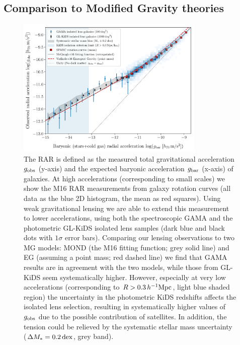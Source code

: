 \documentclass[usenatbib]{mnras}
\newcommand{\hMpc}{\, h^{-1}{\rm{Mpc}} }
\newcommand{\un}[1]{_{\rm #1}}
\newcommand{\dex}{\, {\rm dex}}
\begin{document}
\subsection{Comparison to Modified Gravity theories}
\label{sec:results-analytical}

\begin{figure}
	\includegraphics[width=0.8\textwidth]{Figures/RAR_KiDS+GAMA+Verlinde_Nobins_isolated_zoomout.pdf}
	\caption{The RAR is defined as the measured total gravitational acceleration $g\un{obs}$ (y-axis) and the expected baryonic acceleration $g\un{bar}$ (x-axis) of galaxies. At high accelerations (corresponding to small scales) we show the M16 RAR measurements from galaxy rotation curves (all data as the blue 2D histogram, the mean as red squares). Using weak gravitational lensing we are able to extend this measurement to lower accelerations, using both the spectroscopic GAMA and the photometric GL-KiDS isolated lens samples (dark blue and black dots with $1\sigma$ error bars). Comparing our lensing observations to two MG models: MOND (the M16 fitting function; grey solid line) and EG (assuming a point mass; red dashed line) we find that GAMA results are in agreement with the two models, while those from GL-KiDS seem systematically higher. However, especially at very low accelerations (corresponding to $R > 0.3 \hMpc$, light blue shaded region) the uncertainty in the photometric KiDS redshifts affects the isolated lens selection, resulting in systematically higher values of $g\un{obs}$ due to the possible contribution of satellites. In addition, the tension could be relieved by the systematic stellar mass uncertainty ($\Delta M_*=0.2 \dex$, grey band).}
	\label{fig:RAR_kids_gama_verlinde}
\end{figure}
\end{document}
